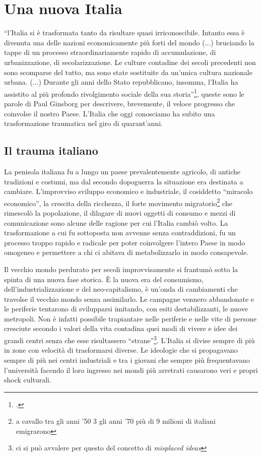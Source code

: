 \section{Una nuova Italia}
\enquote{l'Italia si è trasformata tanto da risultare quasi irriconoscibile. Intanto essa è divenuta una delle nazioni economicamente più forti del mondo (...) bruciando la tappe di un processo straordinariamente rapido di accumulazione, di urbanizzazione, di secolarizzazione. Le culture contadine dei secoli precedenti non sono scomparse del tutto, ma sono state sostituite da un'unica cultura nazionale urbana. (...) Durante gli anni dello Stato repubblicano, insomma, l'Italia ha assistito al più profondo rivolgimento sociale della sua storia}\footcite{Ginsborg7}, queste sono le parole di Paul Ginsborg per descrivere, brevemente, il veloce progresso che coinvolse il nostro Paese.
L'Italia che oggi conosciamo ha subito una trasformazione traumatica nel giro di quarant'anni.


\subsection{Il trauma italiano}
La penisola italiana fu a lungo un paese prevalentemente agricolo, di antiche tradizioni e costumi, ma dal secondo dopoguerra la situazione era destinata a cambiare.
L'improvviso sviluppo economico e industriale, il cosiddetto \enquote{miracolo economico}, la crescita della ricchezza, il forte movimento migratorio\footnote{a cavallo tra gli anni '50 3 gli anni '70 più di 9 milioni di italiani emigrarono} che rimescolò la popolazione, il dilagare di nuovi oggetti di consumo e mezzi di comunicazione sono alcune delle ragione per cui l'Italia cambiò volto.
La trasformazione a cui fu sottoposta non avvenne senza contraddizioni, fu un processo troppo rapido e radicale per poter coinvolgere l'intero Paese in modo omogeneo e permettere a chi ci abitava di metabolizzarlo in modo consapevole.

Il vecchio mondo perdurato per secoli improvvisamente si frantumò sotto la spinta di una nuova fase storica.
È la nuova era del consumismo, dell'industrializzazione e del neo-capitalismo, è un'onda di cambiamenti che travolse il vecchio mondo senza assimilarlo.
Le campagne vennero abbandonate e le periferie tentarono di svilupparsi imitando, con esiti destabilizzanti, le nuove metropoli.
Non è infatti possibile trapiantare nelle periferie e nelle vite di persone cresciute secondo i valori della vita contadina quei modi di vivere e idee dei grandi centri senza che esse risultassero \enquote{strane}\footnote{ci si può avvalere per questo del concetto di \textit{misplaced ideas}}.
L'Italia si divise sempre di più in zone con velocità di trasformarsi diverse.
Le ideologie che si propagavano sempre di più nei centri industriali e tra i giovani che sempre più frequentavano l'università facendo il loro ingresso nei mondi più arretrati causarono veri e propri shock culturali.

